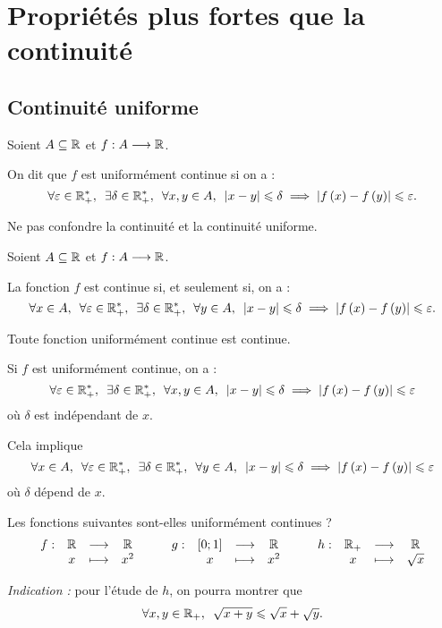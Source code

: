 \section{Propriétés plus fortes que la continuité}

\subsection{Continuité uniforme}

\begin{defi}
Soient \(A\subseteq\mathbb{R}\) et \(f:A\longrightarrow\mathbb{R}\).

On dit que \(f\) est uniformément continue si on a : \[\quantifs{\forall\epsilon\in\Rps;\exists\delta\in\Rps;\forall x,y\in A}\abs{x-y}\leq\delta\imp\abs{f\paren{x}-f\paren{y}}\leq\epsilon.\]
\end{defi}

\begin{rem}
Ne pas confondre la continuité et la continuité uniforme.

Soient \(A\subseteq\mathbb{R}\) et \(f:A\longrightarrow\mathbb{R}\).

La fonction \(f\) est continue si, et seulement si, on a : \[\quantifs{\forall x\in A;\forall\epsilon\in\Rps;\exists\delta\in\Rps;\forall y\in A}\abs{x-y}\leq\delta\imp\abs{f\paren{x}-f\paren{y}}\leq\epsilon.\]
\end{rem}

\begin{prop}
Toute fonction uniformément continue est continue.
\end{prop}

\begin{dem}
Si \(f\) est uniformément continue, on a : \[\quantifs{\forall\epsilon\in\Rps;\exists\delta\in\Rps;\forall x,y\in A}\abs{x-y}\leq\delta\imp\abs{f\paren{x}-f\paren{y}}\leq\epsilon\] où \(\delta\) est indépendant de \(x\).

Cela implique \[\quantifs{\forall x\in A;\forall\epsilon\in\Rps;\exists\delta\in\Rps;\forall y\in A}\abs{x-y}\leq\delta\imp\abs{f\paren{x}-f\paren{y}}\leq\epsilon\] où \(\delta\) dépend de \(x\).
\end{dem}

\begin{exo}
Les fonctions suivantes sont-elles uniformément continues ? \[\begin{array}[t]{cccc}f : & \mathbb{R} & \longrightarrow & \mathbb{R} \\ & x & \longmapsto & x^2\end{array}\qquad\begin{array}[t]{cccc}g : & \left[0;1\right] & \longrightarrow & \mathbb{R} \\ & x & \longmapsto & x^2\end{array}\qquad\begin{array}[t]{cccc}h : & \mathbb{R}_+ & \longrightarrow & \mathbb{R} \\ & x & \longmapsto & \sqrt{x}\end{array}\]

\textit{Indication :} pour l'étude de \(h\), on pourra montrer que \[\quantifs{\forall x,y\in\Rp}\sqrt{x+y}\leq\sqrt{x}+\sqrt{y}.\]
\end{exo}

